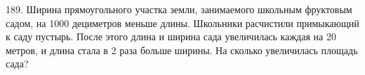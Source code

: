 189.  Ширина прямоугольного участка земли, занимаемого школьным фруктовым садом, на 1000 дециметров меньше длины. Школьники расчистили примыкающий к саду пустырь. После этого длина и ширина сада увеличилась каждая на 20 метров, и длина стала в 2 раза больше ширины. На сколько увеличилась площадь сада?\\
